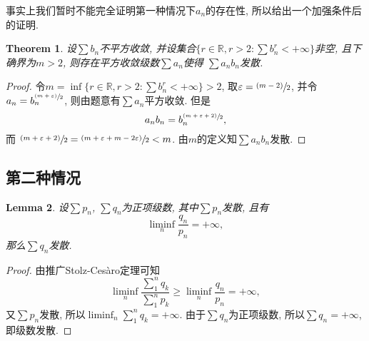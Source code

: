 \documentclass[a4paper, 12pt]{ctexart}
\newtheorem{theorem}{Theorem}[section]
\newtheorem{lemma}[theorem]{Lemma}
\theoremstyle{plain}
\theoremstyle{plain}
\theoremstyle{plain}
\theoremstyle{nonumberplain}
\newtheorem{proof}{Proof}
\newcommand{\BR}{\mathbb{R}}
\begin{document}
    事实上我们暂时不能完全证明第一种情况下$a_{n}$的存在性,
    所以给出一个加强条件后的证明.

    \begin{theorem}
        设$\sum{b_{n}}$不平方收敛,
        并设集合$\{r\in \BR, r > 2: \sum{b_{n}^{r}}<+\infty\}$非空,
        且下确界为$m>2$,
        则存在平方收敛级数$\sum{a_{n}}$使得
        $\sum{a_{n}b_{n}}$发散.
    \end{theorem}

    \begin{proof}
        令$m=\inf\{r\in \BR, r > 2: \sum{b_{n}^{r}}<+\infty\}>2$,
        取$\varepsilon = \sfrac{(m-2)}{2}$,
        并令$a_{n}=b_{n}^{\sfrac{(m+\varepsilon)}{2}}$,
        则由题意有$\sum{a_{n}}$平方收敛.
        但是
        \begin{equation}
            a_{n}b_{n} = b_{n}^{\sfrac{(m+\varepsilon+2)}{2}},
        \end{equation}
        而
        $\sfrac{(m+\varepsilon+2)}{2}
        =
        \sfrac{(m+\varepsilon+m-2\varepsilon)}{2}
        < m$.
        由$m$的定义知$\sum{a_{n}b_{n}}$发散.
    \end{proof}

    \subsection{第二种情况}

    \begin{lemma}
        设$\sum{p_{n}}$, $\sum{q_{n}}$为正项级数, 其中$\sum{p_{n}}$发散,
        且有
        \begin{equation}
            \label{equation_liminf}
            \liminf_{n}{\frac{q_{n}}{p_{n}}} = +\infty,
        \end{equation}
        那么$\sum{q_{n}}$发散.
    \end{lemma}

    \clearpage

    \begin{proof}
        由推广Stolz-Ces\`aro定理可知
        \begin{equation}
            \liminf_{n}{\frac{\sum_{1}^{n}{q_{k}}}{\sum_{1}^{n}{p_{k}}}}
            \geq
            \liminf_{n}{\frac{{q_{n}}}{{p_{n}}}}
            =
            +\infty,
        \end{equation}
        又$\sum{p_{n}}$发散, 所以$\liminf_{n}{\sum_{1}^{n}{q_{k}}}=+\infty$.
        由于$\sum{q_{n}}$为正项级数, 所以$\sum{q_{n}}=+\infty$, 即级数发散.
    \end{proof}
\end{document}
